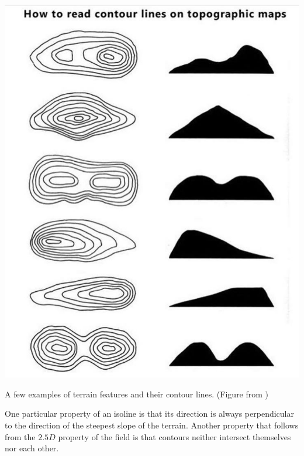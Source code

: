 \begin{marginfigure}
  \includegraphics{figs/contours.jpg}
  \caption{A few examples of terrain features and their contour lines. (Figure from \citet{Kjellstrom99})}%
\end{marginfigure}

One particular property of an isoline is that its direction is always perpendicular to the direction of the steepest slope of the terrain. 
Another property that follows from the $2.5D$ property of the field is that contours neither intersect themselves nor each other.

%

